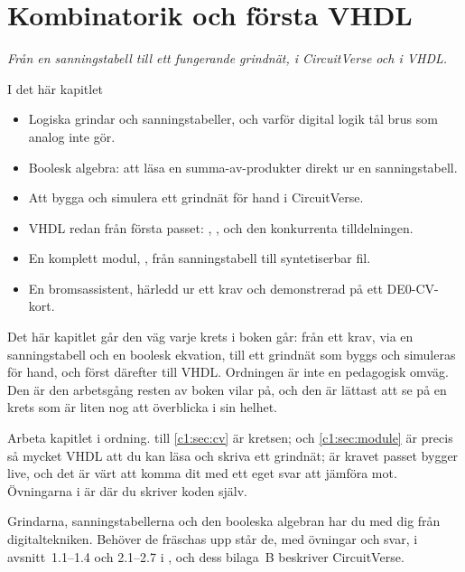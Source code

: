 
\chapter{Kombinatorik och första VHDL}
\label{c1:ch}

{\large\itshape Från en sanningstabell till ett fungerande grindnät, i CircuitVerse och i VHDL.\par}

\begin{chapterbox}{I det här kapitlet}
\begin{itemize}
  \item Logiska grindar och sanningstabeller, och varför digital logik tål brus som analog inte
    gör.
  \item Boolesk algebra: att läsa en summa-av-produkter direkt ur en sanningstabell.
  \item Att bygga och simulera ett grindnät för hand i CircuitVerse.
  \item VHDL redan från första passet: , ,  och
    den konkurrenta tilldelningen.
  \item En komplett modul, , från sanningstabell till syntetiserbar fil.
  \item En bromsassistent, härledd ur ett krav och demonstrerad på ett DE0-CV-kort.
\end{itemize}
\end{chapterbox}

Det här kapitlet går den väg varje krets i boken går: från ett krav, via en sanningstabell och en
boolesk ekvation, till ett grindnät som byggs och simuleras för hand, och först därefter till
VHDL. Ordningen är inte en pedagogisk omväg. Den är den arbetsgång resten av boken vilar på, och
den är lättast att se på en krets som är liten nog att överblicka i sin helhet.

Arbeta kapitlet i ordning.  till \ref{c1:sec:cv} är kretsen; 
och \ref{c1:sec:module} är precis så mycket VHDL att du kan läsa och skriva ett grindnät;
 är kravet passet bygger live, och det är värt att komma dit med ett eget svar
att jämföra mot. Övningarna i  är där du skriver koden själv.

\note[Repetition] Grindarna, sanningstabellerna och den booleska algebran har du med dig från
digitaltekniken. Behöver de fräschas upp står de, med övningar och svar, i avsnitt~1.1--1.4 och
2.1--2.7 i \debook{}, och dess bilaga~B beskriver CircuitVerse.




